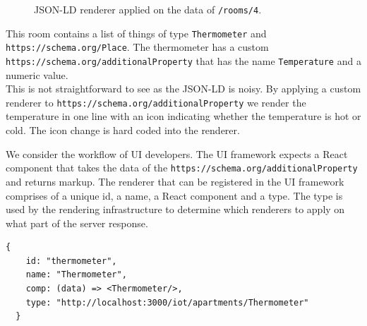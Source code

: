 \begin{figure}[!htb]
  \caption{JSON-LD renderer applied on the data of \lstinline{/rooms/4}.}
\end{figure}

This room contains a list of things of type \lstinline{Thermometer} and \lstinline{https://schema.org/Place}. The thermometer has a custom \lstinline{https://schema.org/additionalProperty} that has the name \lstinline{Temperature} and a numeric value. \\
This is not straightforward to see as the JSON-LD is noisy. By applying a custom renderer to \lstinline{https://schema.org/additionalProperty} we render the temperature in one line with an icon indicating whether the temperature is hot or cold. The icon change is hard coded into the renderer.

We consider the workflow of UI developers. The UI framework expects a React component that takes the data of the \lstinline{https://schema.org/additionalProperty} and returns markup. The renderer that can be registered in the UI framework comprises of a unique id, a name, a React component and a type. The type is used by the rendering infrastructure to determine which renderers to apply on what part of the server response.

\lstset{language=JSON}
\begin{lstlisting}[caption=Renderer configuration that the developer provides.]
  {
    id: "thermometer",
    name: "Thermometer",
    comp: (data) => <Thermometer/>,
    type: "http://localhost:3000/iot/apartments/Thermometer"
  }
\end{lstlisting}

